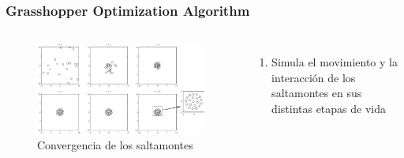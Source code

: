 \begin{frame}
  \frametitle{Grasshopper Optimization Algorithm}
  \begin{columns}
    \begin{figure}
      \begin{center}
        \includegraphics[width=\textwidth]{imagenes/chapter3/goa-position-convergence.png}
      \end{center}
      \caption{Convergencia de los saltamontes \footnotemark[5]}
    \end{figure}
    \begin{enumerate}
      \item Simula el movimiento y la interacción de los saltamontes en sus distintas etapas de vida
    \end{enumerate}
  \end{columns}
\end{frame}

